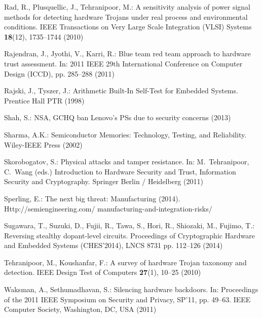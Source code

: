 \documentclass[a4paper]{llncs}
\begin{document}
\begin{thebibliography}{10}
Rad, R., Plusquellic, J., Tehranipoor, M.: A sensitivity analysis of power
  signal methods for detecting hardware {T}rojans under real process and
  environmental conditions.
\newblock IEEE Transactions on Very Large Scale Integration (VLSI) Systems
  \textbf{18}(12), 1735--1744 (2010)

Rajendran, J., Jyothi, V., Karri, R.: Blue team red team approach to hardware
  trust assessment.
\newblock In: 2011 IEEE 29th International Conference on Computer Design
  (ICCD), pp. 285--288 (2011)

Rajski, J., Tyszer, J.: Arithmetic Built-In Self-Test for Embedded Systems.
\newblock Prentice Hall PTR (1998)

Shah, S.: {NSA}, {GCHQ} ban {L}enovo's {PS}s due to security concerns (2013)

Sharma, A.K.: Semiconductor Memories: Technology, Testing, and Reliability.
\newblock Wiley-IEEE Press (2002)

Skorobogatov, S.: Physical attacks and tamper resistance.
\newblock In: M.~Tehranipoor, C.~Wang (eds.) Introduction to Hardware Security
  and Trust, Information Security and Cryptography. Springer Berlin /
  Heidelberg (2011)

Sperling, E.: The next big threat: Manufacturing (2014).
\newblock Http://semiengineering.com/ manufacturing-and-integration-risks/

Sugawara, T., Suzuki, D., Fujii, R., Tawa, S., Hori, R., Shiozaki, M., Fujimo,
  T.: Reversing stealthy dopant-level circuits.
\newblock Proceedings of Cryptographic Hardware and Embedded Systems
  (CHES'2014), LNCS 8731 pp. 112--126 (2014)

Tehranipoor, M., Koushanfar, F.: A survey of hardware {T}rojan taxonomy and
  detection.
\newblock IEEE Design Test of Computers \textbf{27}(1), 10--25 (2010)

Waksman, A., Sethumadhavan, S.: Silencing hardware backdoors.
\newblock In: Proceedings of the 2011 IEEE Symposium on Security and Privacy,
  SP'11, pp. 49--63. IEEE Computer Society, Washington, DC, USA (2011)

\end{thebibliography}


 
\end{document}
